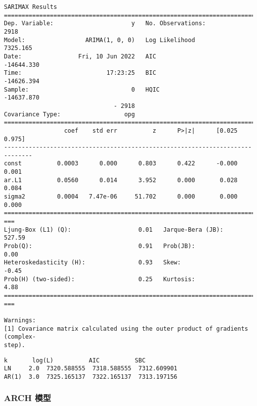 \documentclass[11pt]{article}
\makeatletter
\newcommand{\boxspacing}{\kern\kvtcb@left@rule\kern\kvtcb@boxsep}
\newcommand{\prompt}[4]{
        {\ttfamily\llap{{\color{#2}[#3]:\hspace{3pt}#4}}\vspace{-\baselineskip}}
    }
\makeatother
\begin{document}
    \begin{Verbatim}[commandchars=\\\{\}]
                               SARIMAX Results
==============================================================================
Dep. Variable:                      y   No. Observations:                 2918
Model:                 ARIMA(1, 0, 0)   Log Likelihood                7325.165
Date:                Fri, 10 Jun 2022   AIC                         -14644.330
Time:                        17:23:25   BIC                         -14626.394
Sample:                             0   HQIC                        -14637.870
                               - 2918
Covariance Type:                  opg
==============================================================================
                 coef    std err          z      P>|z|      [0.025      0.975]
------------------------------------------------------------------------------
const          0.0003      0.000      0.803      0.422      -0.000       0.001
ar.L1          0.0560      0.014      3.952      0.000       0.028       0.084
sigma2         0.0004   7.47e-06     51.702      0.000       0.000       0.000
================================================================================
===
Ljung-Box (L1) (Q):                   0.01   Jarque-Bera (JB):
527.59
Prob(Q):                              0.91   Prob(JB):
0.00
Heteroskedasticity (H):               0.93   Skew:
-0.45
Prob(H) (two-sided):                  0.25   Kurtosis:
4.88
================================================================================
===

Warnings:
[1] Covariance matrix calculated using the outer product of gradients (complex-
step).
    \end{Verbatim}

            \begin{tcolorbox}[breakable, size=fbox, boxrule=.5pt, pad at break*=1mm, opacityfill=0]
\prompt{Out}{outcolor}{3}{\boxspacing}
\begin{Verbatim}[commandchars=\\\{\}]
         k       log(L)          AIC          SBC
LN     2.0  7320.588555  7318.588555  7312.609901
AR(1)  3.0  7325.165137  7322.165137  7313.197156
\end{Verbatim}
\end{tcolorbox}

    \hypertarget{arch-ux6a21ux578b}{%
\subsubsection{ARCH 模型}\label{arch-ux6a21ux578b}}
\end{document}
